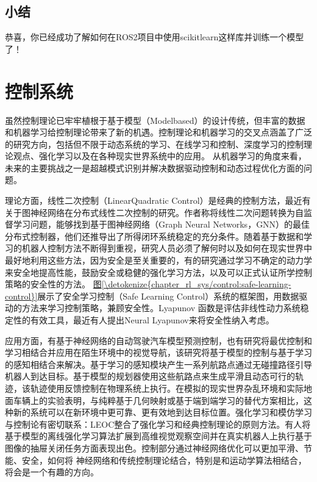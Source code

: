 \documentclass[letterpaper,10pt,english]{sphinxmanual}
\begin{document}
\subsection{小结}
\label{\detokenize{chapter_rl_sys/planning_code_ex:id7}}
\sphinxAtStartPar
恭喜，你已经成功了解如何在ROS2项目中使用scikit\sphinxhyphen{}learn这样库并训练一个模型了！


\section{控制系统}
\label{\detokenize{chapter_rl_sys/control:id1}}\label{\detokenize{chapter_rl_sys/control::doc}}
\sphinxAtStartPar
虽然控制理论已牢牢植根于基于模型（Model\sphinxhyphen{}based）的设计传统，但丰富的数据和机器学习给控制理论带来了新的机遇。控制理论和机器学习的交叉点涵盖了广泛的研究方向，包括但不限于动态系统的学习、在线学习和控制、深度学习的控制理论观点、强化学习以及在各种现实世界系统中的应用。
从机器学习的角度来看，未来的主要挑战之一是超越模式识别并解决数据驱动控制和动态过程优化方面的问题。

\sphinxAtStartPar
理论方面，线性二次控制（Linear\sphinxhyphen{}Quadratic
Control）是经典的控制方法，最近有关于图神经网络在分布式线性二次控制的研究。作者称将线性二次问题转换为自监督学习问题，能够找到基于图神经网络（Graph
Neural
Networks，GNN）的最佳分布式控制器，他们还推导出了所得闭环系统稳定的充分条件。随着基于数据和学习的机器人控制方法不断得到重视，研究人员必须了解何时以及如何在现实世界中最好地利用这些方法，因为安全是至关重要的，有的研究通过学习不确定的动力学来安全地提高性能，鼓励安全或稳健的强化学习方法，以及可以正式认证所学控制策略的安全性的方法。
\hyperref[\detokenize{chapter_rl_sys/control:safe-learning-control}]{图\ref{\detokenize{chapter_rl_sys/control:safe-learning-control}}}展示了安全学习控制（Safe Learning
Control）系统的框架图，用数据驱动的方法来学习控制策略，兼顾安全性。Lyapunov
函数是评估非线性动力系统稳定性的有效工具，最近有人提出Neural
Lyapunov来将安全性纳入考虑。

\sphinxAtStartPar
应用方面，有基于神经网络的自动驾驶汽车模型预测控制，也有研究将最优控制和学习相结合并应用在陌生环境中的视觉导航，该研究将基于模型的控制与基于学习的感知相结合来解决。基于学习的感知模块产生一系列航路点通过无碰撞路径引导机器人到达目标。基于模型的规划器使用这些航路点来生成平滑且动态可行的轨迹，该轨迹使用反馈控制在物理系统上执行。在模拟的现实世界杂乱环境和实际地面车辆上的实验表明，与纯粹基于几何映射或基于端到端学习的替代方案相比，这种新的系统可以在新环境中更可靠、更有效地到达目标位置。强化学习和模仿学习与控制论有密切联系：LEOC整合了强化学习和经典控制理论的原则方法。有人将基于模型的离线强化学习算法扩展到高维视觉观察空间并在真实机器人上执行基于图像的抽屉关闭任务方面表现出色。控制部分通过神经网络优化可以更加平滑、节能、安全，如何将
神经网络和传统控制理论结合，特别是和运动学算法相结合，将会是一个有趣的方向。
\end{document}
